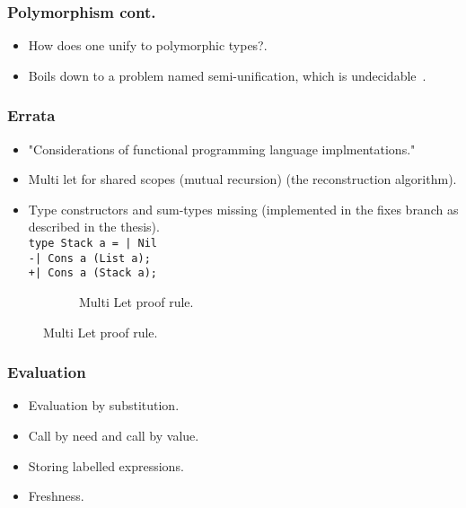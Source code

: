 \documentclass{beamer}
\begin{document}
\begin{frame}
\frametitle{Polymorphism cont.}
    \begin{itemize}
        \item How does one unify to polymorphic types?.
        \item Boils down to a problem named semi-unification, which is undecidable~\cite{WELLS1999111,NAMEHERE}.
    \end{itemize}
\end{frame}

\begin{frame}
\frametitle{Errata}
    \begin{itemize}
        \item "Considerations of functional programming language implmentations."
        \item Multi let for shared scopes (mutual recursion) (the reconstruction algorithm).
        \item Type constructors and sum-types missing (implemented in the fixes branch as described in the thesis).\\
        \texttt{type Stack a = | Nil}\\
        \texttt{-| Cons a (List a);}\\
        \texttt{+| Cons a (Stack a);}
    \end{itemize}
    \begin{figure}
    \hspace*{-1.5cm}
    \begin{subfigure}[b]{1\textwidth}
    \begin{prooftree}
    \end{prooftree}
    \caption{Multi Let proof rule.}
    \end{subfigure}
    \end{figure}
\end{frame}

\begin{frame}
\frametitle{Evaluation}
    \begin{itemize}
        \item Evaluation by substitution.
        \item Call by need and call by value.
        \item Storing labelled expressions.
        \item Freshness.
    \end{itemize}
\end{frame}

\begin{frame}
    \printbibliography
\end{frame}
\end{document}
